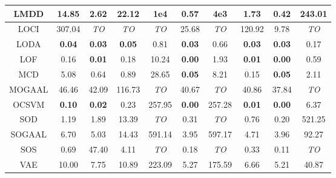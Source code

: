\documentclass{article}
\begin{document}
\begin{table}[!t]
\begin{center}
\begin{small}
\begin{tabular}{|c|c|c|c|c|c|c|c|c|c|}
\hline
LMDD &               14.85 &             2.62 &           22.12 &       1e4 &           0.57 &       4e3 &                1.73 &            0.42 &         243.01 \\
\hline
LOCI &              307.04 &      \textit{TO} &     \textit{TO} &    \textit{TO} &          25.68 &   \textit{TO} &              120.92 &            9.78 &    \textit{TO} \\
\hline
LODA &       \textbf{0.04} &    \textbf{0.03} &   \textbf{0.05} &           0.81 &  \textbf{0.03} &          0.66 &       \textbf{0.03} &   \textbf{0.03} &           0.17 \\
\hline
LOF &                0.16 &    \textbf{0.01} &            0.18 &          10.24 &  \textbf{0.00} &          1.93 &       \textbf{0.01} &   \textbf{0.00} &           0.59 \\
\hline
MCD &                5.08 &             0.64 &            0.89 &          28.65 &  \textbf{0.05} &          8.21 &                0.15 &   \textbf{0.05} &           2.11 \\
\hline
MOGAAL &               46.46 &            42.09 &          116.73 &    \textit{TO} &          40.67 &   \textit{TO} &               40.86 &           37.84 &    \textit{TO} \\
\hline
OCSVM &       \textbf{0.10} &    \textbf{0.02} &            0.23 &         257.95 &  \textbf{0.00} &        257.28 &       \textbf{0.01} &   \textbf{0.00} &           6.37 \\
\hline
SOD &                1.19 &             1.89 &           13.39 &    \textit{TO} &           0.31 &   \textit{TO} &                0.76 &            0.20 &         521.25 \\
\hline
SOGAAL &                6.70 &             5.03 &           14.43 &         591.14 &           3.95 &        597.17 &                4.71 &            3.96 &          92.27 \\
\hline
SOS &                0.69 &            47.40 &            4.11 &    \textit{TO} &           0.18 &   \textit{TO} &                0.33 &            0.11 &    \textit{TO} \\
\hline
VAE &               10.00 &             7.75 &           10.89 &         223.09 &           5.27 &        175.59 &                6.66 &            5.21 &          40.87 \\
\hline
\end{tabular}
\end{small}
\end{center}
\vskip -0.1in
\end{table}
\end{document}
